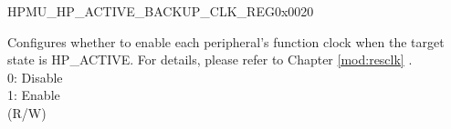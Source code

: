     \begin{register}{H}{PMU\_HP\_ACTIVE\_BACKUP\_CLK\_REG}{0x0020}\label{regdesc:PMUHPACTIVEBACKUPCLKREG}
    \regnewline%
    \begin{regdesc}\begin{reglist}
    \label{fielddesc:PMUHPACTIVEBACKUPICGFUNCEN}\item [PMU\_HP\_ACTIVE\_BACKUP\_ICG\_FUNC\_EN] Configures whether to enable each peripheral's function clock when the target state is HP\_ACTIVE. For details, please refer to Chapter \ref{mod:resclk} \textit{}.\\
0: Disable\\
1: Enable\\
(R/W)

    \end{reglist}\end{regdesc}
    \end{register}


